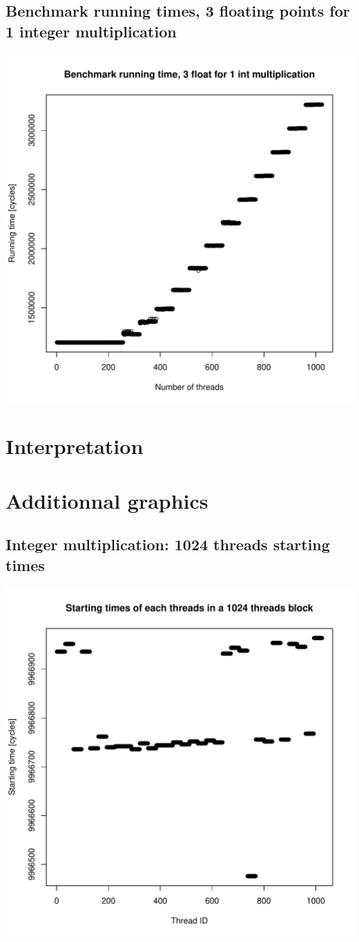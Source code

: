 \documentclass{article}
\begin{document}
	\subsection{Benchmark running times, 3 floating points for 1 integer multiplication}
	\includegraphics[width=\linewidth]{"graphics/running_times_ratio31"}
	\pagebreak

\section{Interpretation}

\section{Additionnal graphics}
	\subsection{Integer multiplication: 1024 threads starting times}
	\includegraphics[width=\linewidth]{"graphics/starting_times_ratio31"}
	\pagebreak
\end{document}
